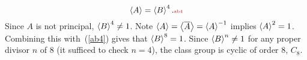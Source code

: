 \begin{ex}
\begin{equation}
\an{A}=\an{B}^4.\llabel{ab4}
\end{equation} Since $A$ is not principal, $\left\langle {B}\right\rangle^4\neq 1$. %
Note $\left\langle {A}\right\rangle=\left\langle {\overline{A}}\right\rangle=\left\langle {A}\right\rangle^{-1}$ implies %
$\left\langle {A}\right\rangle^2=1$. Combining this with~(\ref{ab4}) gives
that $\left\langle {B}\right\rangle^8=1$. Since $\left\langle {B}\right\rangle^n\neq 1$ for any proper divisor $n$ of 8 (it sufficed to check $n=4$), the class group is cyclic of order 8, $C_8$.\\
\end{ex}